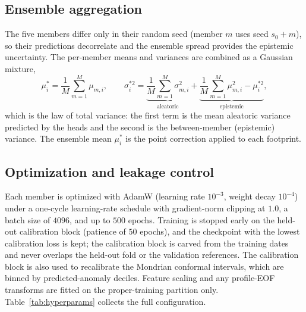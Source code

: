\subsection{Ensemble aggregation}

The five members differ only in their random seed (member $m$ uses seed
$s_0 + m$), so their predictions decorrelate and the ensemble spread provides
the epistemic uncertainty. The per-member means and variances are combined as a
Gaussian mixture,
%
\begin{equation}
  \mu^{*}_i = \frac{1}{M}\sum_{m=1}^{M}\mu_{m,i},
  \qquad
  \sigma^{*2}_i
  = \underbrace{\frac{1}{M}\sum_{m=1}^{M}\sigma_{m,i}^{2}}_{\text{aleatoric}}
  + \underbrace{\frac{1}{M}\sum_{m=1}^{M}\mu_{m,i}^{2} - \mu^{*2}_i}_{\text{epistemic}},
  \label{eq:mixture}
\end{equation}
%
which is the law of total variance: the first term is the mean aleatoric
variance predicted by the heads and the second is the between-member (epistemic)
variance. The ensemble mean $\mu^{*}_i$ is the point correction applied to each
footprint.

\subsection{Optimization and leakage control}

Each member is optimized with AdamW (learning rate $10^{-3}$, weight decay
$10^{-4}$) under a one-cycle learning-rate schedule with gradient-norm clipping
at $1.0$, a batch size of $4096$, and up to $500$ epochs. Training is stopped
early on the held-out calibration block (patience of $50$ epochs), and the
checkpoint with the lowest calibration loss is kept; the calibration block is
carved from the training dates and never overlaps the held-out fold or the
validation references. The calibration block is also used to recalibrate the
Mondrian conformal intervals, which are binned by predicted-anomaly deciles.
Feature scaling and any profile-EOF transforms are fitted on the proper-training
partition only. Table~\ref{tab:hyperparams} collects the full configuration.


